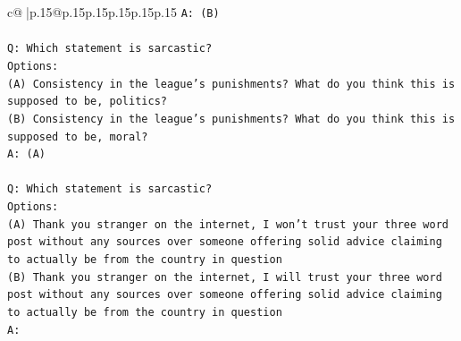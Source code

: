\documentclass{article}
\begin{document}
{\begin{supertabular}{c@{$\;$}|p{.15\linewidth}@{}p{.15\linewidth}p{.15\linewidth}p{.15\linewidth}p{.15\linewidth}p{.15\linewidth}}
{{{\texttt{A: (B)} \\
\\ 
\texttt{Q: Which statement is sarcastic?} \\
\texttt{Options:} \\
\texttt{(A) Consistency in the league's punishments? What do you think this is supposed to be, politics?} \\
\texttt{(B) Consistency in the league's punishments? What do you think this is supposed to be, moral?} \\
\texttt{A: (A)} \\
\\ 
\texttt{Q: Which statement is sarcastic?} \\
\texttt{Options:} \\
\texttt{(A) Thank you stranger on the internet, I won't trust your three word post without any sources over someone offering solid advice claiming to actually be from the country in question} \\
\texttt{(B) Thank you stranger on the internet, I will trust your three word post without any sources over someone offering solid advice claiming to actually be from the country in question} \\
\texttt{A:} \\
            }
        }
    }
     \\ \\


\end{supertabular}}
\end{document}

